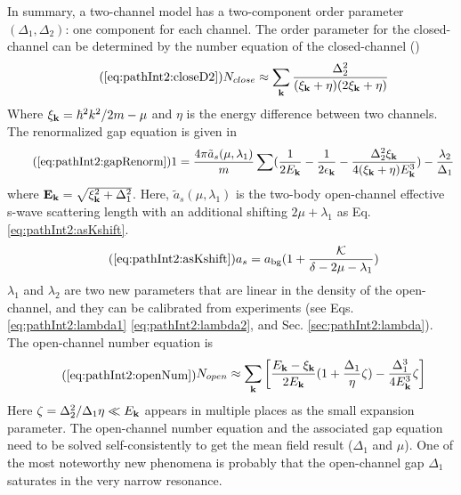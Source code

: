        In  summary, a two-channel model has a two-component order parameter $(\Delta_{1},\Delta_{2})$: one component for each channel.  The order parameter for the closed-channel can be determined by the number equation of the closed-channel ()
\begin{equation}\tag{\ref{eq:pathInt2:closeD2}}
N_{close}\approx\sum_{\vk}\frac{\Delta_{2}^2}{(\xi_{\vk}+\eta)(2\xi_{\vk}+\eta)}
\end{equation}
 Where $\xi_{\mathbf{k}}=\hbar^{2}k^{2}/2m-\mu$ and $\eta$ is the energy difference between two channels. The renormalized gap equation is given in 
 \begin{equation}\tag{\ref{eq:pathInt2:gapRenorm}}
1=\frac{4\pi{\tilde{a}_{s}(\mu,\lambda_{1})}}{m}\sum(\nth{2E_{\vk}}-\nth{2\epsilon_{\vk}}-\frac{\Delta_{2}^{2}\xi_{\vk}}{4(\xi_{\vk}+\eta){E_{\vk}^{3}}})
	-\frac{\lambda_{2}}{\Delta_{1}}
\end{equation}
where $\mathbf{E}_{\mathbf{k}}=\sqrt{\xi_{\mathbf{k}}^{2}+\Delta_{1}^{2}}$. Here, $\tilde{a}_{s}(\mu,\lambda_{1})$ is the two-body open-channel effective  s-wave scattering length with  an additional shifting $2\mu+\lambda_{1}$ as Eq. \ref{eq:pathInt2:asKshift}. 
\begin{equation}\tag{\ref{eq:pathInt2:asKshift}}
{a}_{s}=a_{\text{bg}}(1+\frac{\mathcal{K}}{\delta-2\mu-\lambda_{1}})
\end{equation}
  $\lambda_{1}$ and $\lambda_{2}$ are two new parameters that are  linear in the density of the open-channel, and they can be calibrated from  experiments (see Eqs. \ref{eq:pathInt2:lambda1} \ref{eq:pathInt2:lambda2}, and Sec. \ref{sec:pathInt2:lambda}).  The open-channel number equation is 
\begin{equation}\tag{\ref{eq:pathInt2:openNum}}
\begin{split}
N_{open}\approx\sum_\vk\mbr{\frac{E_\vk-\xi_\vk}{2E_\vk}(1+\frac{\Delta_{1}}{\eta}\zeta)-\frac{\Delta_{1}^{3}}{4E_\vk^{3}}\zeta
	}	
\end{split}
\end{equation}
Here $\zeta=\Delta_{2}^{2}/\Delta_{1}\eta\ll{}E_{\mathbf{k}}$ appears in multiple places as the small expansion parameter.  The open-channel number equation and the associated gap equation need to be solved self-consistently to get  the mean field result ($\Delta_{1}$ and $\mu$).  One of the most noteworthy new phenomena is probably that the open-channel gap $\Delta_{1}$ saturates in the very narrow resonance. 


